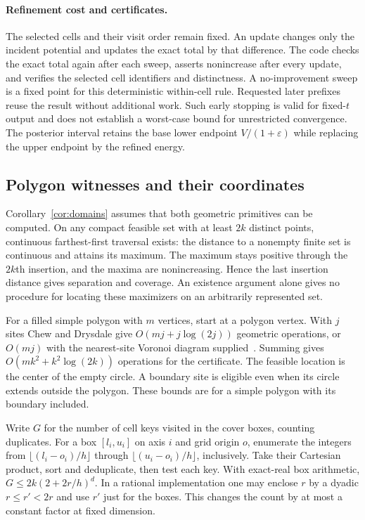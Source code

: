 \documentclass[a4paper,12pt]{article}
\numberwithin{equation}{section}
\begin{document}
\paragraph{Refinement cost and certificates.}
The selected cells and their visit order remain fixed. An update changes only the incident
potential and updates the exact total by that difference. The code checks the exact total again
after each sweep, asserts nonincrease after every update, and verifies the selected cell
identifiers and distinctness. A no-improvement sweep is a fixed point for this deterministic
within-cell rule. Requested later prefixes reuse the result without additional work. Such early
stopping is valid for fixed-$t$ output and does not establish a worst-case bound for unrestricted
convergence. The posterior interval retains the base lower endpoint $V/(1+\varepsilon)$ while
replacing the upper endpoint by the refined energy.

\subsection{Polygon witnesses and their coordinates}\label{app:polygons}
Corollary~\ref{cor:domains} assumes that both geometric primitives can be
computed. On any compact feasible set with at least $2k$ distinct points,
continuous farthest-first traversal exists: the distance to a nonempty finite
set is continuous and attains its maximum. The maximum stays positive through
the $2k$th insertion, and the maxima are nonincreasing. Hence the last insertion
distance gives separation and coverage. An existence argument alone gives no
procedure for locating these maximizers on an arbitrarily represented set.

For a filled simple polygon with $m$ vertices, start at a polygon vertex.
With $j$ sites Chew and Drysdale give $O(mj+j\log(2j))$ geometric operations,
or $O(mj)$ with the nearest-site Voronoi diagram supplied~\cite{chew1986}.
Summing gives $O(mk^2+k^2\log(2k))$ operations for the certificate.
The feasible location is the center of the empty circle. A boundary site is
eligible even when its circle extends outside the polygon. These bounds are
for a simple polygon with its boundary included.

Write $G$ for the number of cell keys visited in the cover boxes, counting
duplicates. For a box $[l_i,u_i]$ on axis $i$ and grid origin $o$, enumerate
the integers from $\lfloor(l_i-o_i)/h\rfloor$ through
$\lfloor(u_i-o_i)/h\rfloor$, inclusively. Take their Cartesian product,
sort and deduplicate, then test each key. With exact-real box arithmetic,
$G\le 2k(2+2r/h)^d$. In a rational implementation one may enclose $r$
by a dyadic $r\le r'<2r$ and use $r'$ just for the boxes. This changes the
count by at most a constant factor at fixed dimension.
\end{document}
